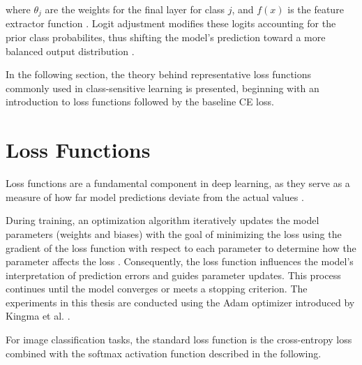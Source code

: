 \noindent where $\theta_j$ are the weights for the final layer for class $j$, and $f(x)$ is the feature extractor function \cite{ren2020balancedmetasoftmaxlongtailedvisual}. Logit adjustment modifies these logits accounting for the prior class probabilites, thus shifting the model's prediction toward a more balanced output distribution \cite{ren2020balancedmetasoftmaxlongtailedvisual}.
\vspace{1em}

\noindent In the following section, the theory behind representative loss functions commonly used in class-sensitive learning is presented, beginning with an introduction to loss functions followed by the baseline CE loss. 

\section{Loss Functions}
\label{sec:intro_losses}
Loss functions are a fundamental component in deep learning, as they serve as a measure of how far model predictions deviate from the actual values \cite{Goodfellow-et-al-2016,zhang2023dive}.

During training, an optimization algorithm iteratively updates the model parameters (weights and biases) with the goal of minimizing the loss using the gradient of the loss function with respect to each parameter to determine how the parameter affects the loss \cite{Goodfellow-et-al-2016}. Consequently, the loss function influences the model's interpretation of prediction errors and guides parameter updates. This process continues until the model converges or meets a stopping criterion. The experiments in this thesis are conducted using the Adam optimizer introduced by Kingma et al. \cite{kingma2017adammethodstochasticoptimization}.

For image classification tasks, the standard loss function is the cross-entropy loss combined with the softmax activation function \cite{zhang2023dive} described in the following.


